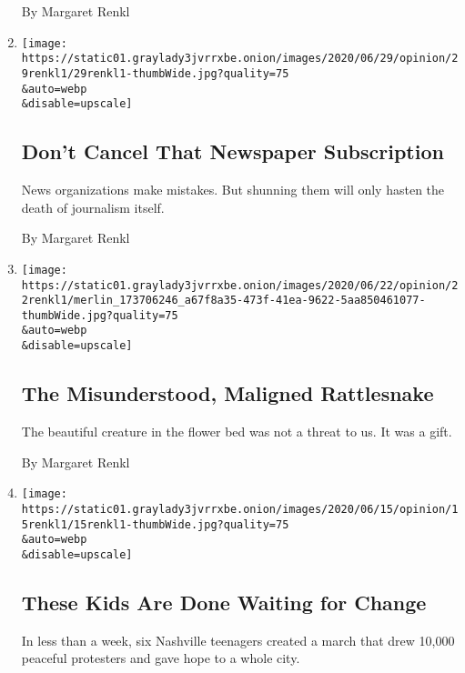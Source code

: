 \begin{enumerate}
  By Margaret Renkl
\item
  \href{/2020/06/29/opinion/tennessean-newspaper.html}{}

  \texttt{[image: https://static01.graylady3jvrrxbe.onion/images/2020/06/29/opinion/29renkl1/29renkl1-thumbWide.jpg?quality=75\\\&auto=webp\\\&disable=upscale]}

  \hypertarget{dont-cancel-that-newspaper-subscription}{%
  \subsection{Don't Cancel That Newspaper
  Subscription}\label{dont-cancel-that-newspaper-subscription}}

  News organizations make mistakes. But shunning them will only hasten
  the death of journalism itself.

  By Margaret Renkl
\item
  \href{/2020/06/22/opinion/rattlesnakes.html}{}

  \texttt{[image: https://static01.graylady3jvrrxbe.onion/images/2020/06/22/opinion/22renkl1/merlin\_173706246\_a67f8a35-473f-41ea-9622-5aa850461077-thumbWide.jpg?quality=75\\\&auto=webp\\\&disable=upscale]}

  \hypertarget{the-misunderstood-maligned-rattlesnake}{%
  \subsection{The Misunderstood, Maligned
  Rattlesnake}\label{the-misunderstood-maligned-rattlesnake}}

  The beautiful creature in the flower bed was not a threat to us. It
  was a gift.

  By Margaret Renkl
\item
  \href{/2020/06/15/opinion/nashville-teens-protests.html}{}

  \texttt{[image: https://static01.graylady3jvrrxbe.onion/images/2020/06/15/opinion/15renkl1/15renkl1-thumbWide.jpg?quality=75\\\&auto=webp\\\&disable=upscale]}

  \hypertarget{these-kids-are-done-waiting-for-change}{%
  \subsection{These Kids Are Done Waiting for
  Change}\label{these-kids-are-done-waiting-for-change}}

  In less than a week, six Nashville teenagers created a march that drew
  10,000 peaceful protesters and gave hope to a whole city.


\end{enumerate}
